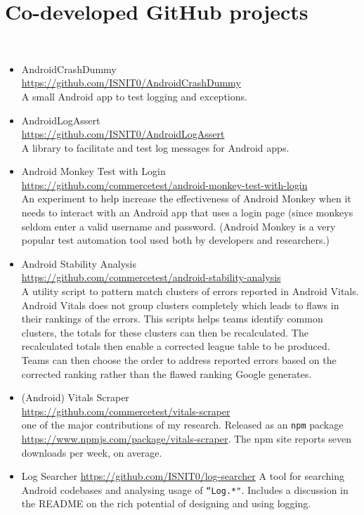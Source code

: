 \section{Co-developed GitHub projects}~\label{subsec:co-developed-github-projects}
\begin{itemize}
    \item AndroidCrashDummy\\ \url{https://github.com/ISNIT0/AndroidCrashDummy}\\ A small Android app to test logging and exceptions.
    \item AndroidLogAssert\\ \url{https://github.com/ISNIT0/AndroidLogAssert}\\ A library to facilitate and test log messages for Android apps.
    \item Android Monkey Test with Login \\ \url{https://github.com/commercetest/android-monkey-test-with-login}\\ An experiment to help increase the effectiveness of Android Monkey when it needs to interact with an Android app that uses a login page (since monkeys seldom enter a valid username and password. (Android Monkey is a very popular test automation tool used both by developers and researchers.) 
    \item Android Stability Analysis\\ \url{https://github.com/commercetest/android-stability-analysis}\\ A utility script to pattern match clusters of errors reported in Android Vitals. Android Vitals does not group clusters completely which leads to flaws in their rankings of the errors. This scripts helps teams identify common clusters, the totals for these clusters can then be recalculated. The recalculated totals then enable a corrected league table to be produced. Teams can then choose the order to address reported errors based on the corrected ranking rather than the flawed ranking Google generates.
    \item (Android) Vitals Scraper\\ \url{https://github.com/commercetest/vitals-scraper}\\ one of the major contributions of my research. Released as an \texttt{npm} package \url{https://www.npmjs.com/package/vitals-scraper}. The npm site reports seven downloads per week, on average.
    \item Log Searcher \url{https://github.com/ISNIT0/log-searcher} A tool for searching Android codebases and analysing usage of \texttt{``Log.*"}. Includes a discussion in the README on the rich potential of designing and using logging.

\end{itemize}

